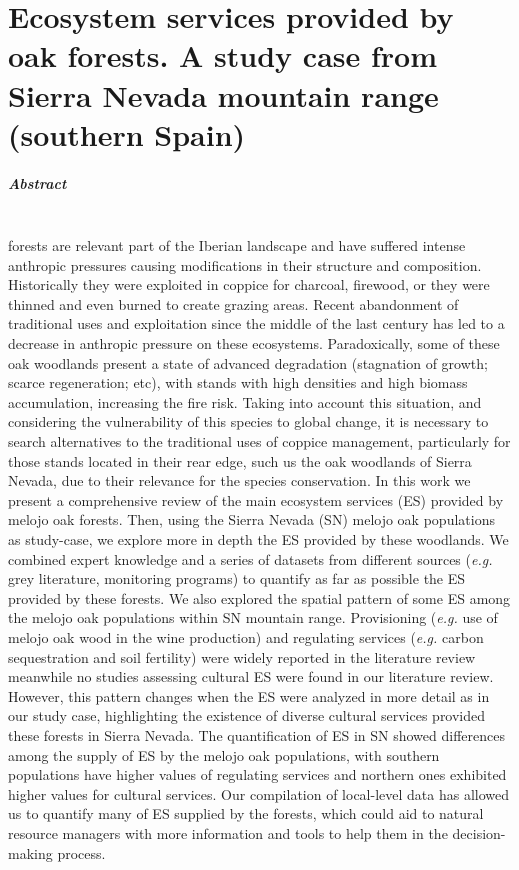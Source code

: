 %
\chapter{\textcolor{ctcolormain}{Ecosystem services provided by \Qpw oak forests}. A study case from Sierra Nevada mountain range (southern Spain)}\label{sec:es}

\mbox{}
\vfill


\newpage

\paragraph{Abstract} \mbox{} \\
\Qp forests are relevant part of the Iberian landscape and have suffered intense anthropic pressures causing modifications in their structure and composition. Historically they were exploited in coppice for charcoal, firewood, or they were thinned and even burned to create grazing areas. Recent abandonment of traditional uses and exploitation since the middle of the last century has led to a decrease in anthropic pressure on these ecosystems. Paradoxically, some of these oak woodlands present a state of advanced degradation (stagnation of growth; scarce regeneration; etc), with stands with high densities and high biomass accumulation, increasing the fire risk. Taking into account this situation, and considering the vulnerability of this species to global change, it is necessary to search alternatives to the traditional uses of coppice management, particularly for those stands located in their rear edge, such us the oak woodlands of Sierra Nevada, due to their relevance for the species conservation. In this work we present a comprehensive review of the main ecosystem services (ES) provided by melojo oak forests. Then, using the Sierra Nevada (SN) melojo oak populations as study-case, we explore more in depth the ES provided by these woodlands. We combined expert knowledge and a series of datasets from different sources (\emph{e.g.} grey literature, monitoring programs) to quantify as far as possible the ES provided by these forests. We also explored the spatial pattern of some ES among the melojo oak populations within SN mountain range. Provisioning (\emph{e.g.} use of melojo oak wood in the wine production) and regulating services (\emph{e.g.} carbon sequestration and soil fertility) were widely reported in the literature review meanwhile no studies assessing cultural ES were found in our literature review. However, this pattern changes when the ES were analyzed in more detail as in our study case, highlighting the existence of diverse cultural services provided these forests in Sierra Nevada. The quantification of ES in SN showed differences among the supply of ES by the melojo oak populations, with southern populations have higher values of regulating services and northern ones exhibited higher values for cultural services. Our compilation of local-level data has allowed us to quantify many of ES supplied by the \Qpy forests, which could aid to natural resource managers with more information and tools to help them in the decision-making process.
